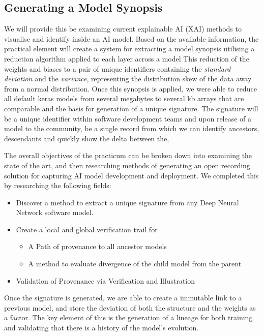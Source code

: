 \subsection{Generating a Model Synopsis}
We will provide this be examining current explainable AI (XAI) methods to visualise and identify inside an AI model. Based on the available information, the practical element will create a system for extracting a model synopsis utilising a reduction algorithm applied to each layer across a model This reduction of the weights and biases to a pair of unique identifiers containing the \textit{standard deviation} and the \textit{variance}, representing the distribution skew of the data away from a normal distribution. Once this synopsis is applied, we were able to reduce all default keras models from several megabytes to several kb arrays that are comparable and the basis for generation of a unique signature. The signature will be a unique identifier within software development teams and upon release of a model to the community, be a single record from which we can identify ancestors, descendants and quickly show the delta between the,

The overall objectives of the practicum can be broken down into examining the state of the art, and then researching methods of generating an open recording solution for capturing AI model development and deployment. We completed this by researching the following fields:

\begin{itemize}
    \item Discover a method to extract a unique signature from any Deep Neural Network software model.
    \item Create a local and global verification trail for
    \begin{itemize}
        \item A Path of provenance to all ancestor models
        \item A method to evaluate divergence of the child model from the parent
    \end{itemize}
    \item Validation of Provenance via Verification and Illustration
\end{itemize}

Once the signature is generated, we are able to create a immutable link to a previous model, and store the deviation of both the structure and the weights as a factor. The key element of this is the generation of a lineage for both training and validating that there is a history of the model's evolution.

